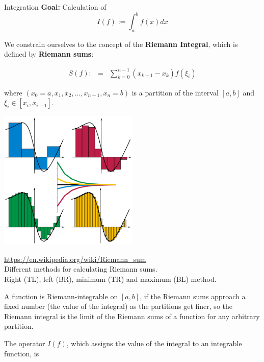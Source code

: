 \begin{vbframe}{Integration}
\textbf{Goal:} Calculation of
$$
I(f) := \int_a^b f(x)dx
$$

\lz

We constrain ourselves to the concept of the \textbf{Riemann Integral}, which is defined by \textbf{Riemann sums}:

\begin{eqnarray*}
S(f) :&=& \sum_{k=0}^{n-1}(x_{k+1} - x_k) f(\xi_i)
\end{eqnarray*}

where $(x_0 = a, x_1, x_2, ..., x_{n-1}, x_n = b)$ is a partition of the interval $[a, b]$ and $\xi_i \in [x_i, x_{i+1}]$.

\framebreak

\begin{center}
\includegraphics[width = 0.5\textwidth]{figure_man/riemannsums.png} \\
\begin{footnotesize}
\url{https://en.wikipedia.org/wiki/Riemann_sum}\\
Different methods for calculating Riemann sums.\\
Right (TL), left (BR), minimum (TR) and maximum (BL) method.

\end{footnotesize}
\end{center}

\framebreak

A function is Riemann-integrable on $[a, b]$, if the Riemann sums approach a fixed number (the value of the integral) as the partitions get finer, so the Riemann integral is the limit of the Riemann sums of a function for any arbitrary partition.

\lz

The operator $I(f)$, which assigns the value of the integral to an integrable function, is


\end{vbframe}

